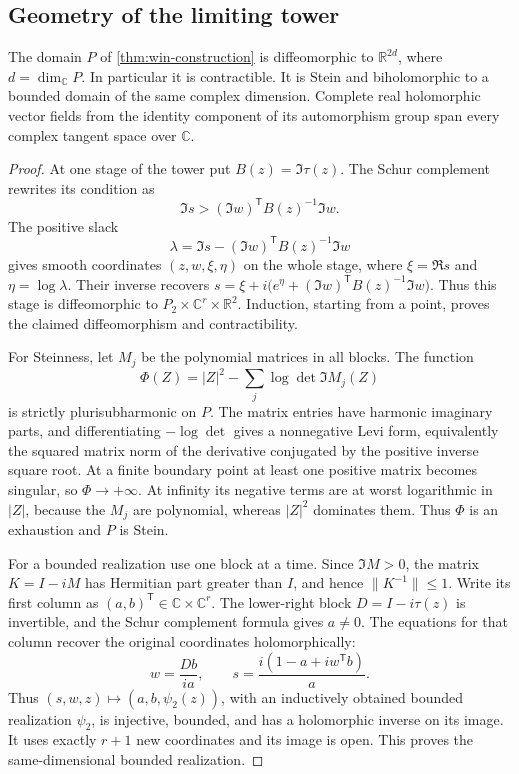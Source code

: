 \subsection{Geometry of the limiting tower}

\begin{proposition}\label{prop:win-tower-properties}
The domain $P$ of \cref{thm:win-construction} is diffeomorphic to $\mathbb{R}^{2d}$, where $d=\dim_{\mathbb{C}}P$.  In particular it is contractible.  It is Stein and biholomorphic to a bounded domain of the same complex dimension.  Complete real holomorphic vector fields from the identity component of its automorphism group span every complex tangent space over $\mathbb{C}$.
\end{proposition}

\begin{proof}
At one stage of the tower put $B(z)=\Im\tau(z)$.  The Schur complement rewrites its condition as
\[
       \Im s>(\Im w)^{\mathsf T}B(z)^{-1}\Im w.
\]
The positive slack
\[
 \lambda=\Im s-(\Im w)^{\mathsf T}B(z)^{-1}\Im w
\]
gives smooth coordinates $(z,w,\xi,\eta)$ on the whole stage, where $\xi=\Re s$ and $\eta=\log\lambda$.  Their inverse recovers $s=\xi+i\bigl(e^\eta+ (\Im w)^{\mathsf T}B(z)^{-1}\Im w\bigr)$. Thus this stage is diffeomorphic to $P_2\times\mathbb{C}^r\times\mathbb{R}^2$.  Induction, starting from a point, proves the claimed diffeomorphism and contractibility.

For Steinness, let $M_j$ be the polynomial matrices in all blocks. The function
\[
             \Phi(Z)=|Z|^2-\sum_j\log\det\Im M_j(Z)
\]
is strictly plurisubharmonic on $P$.  The matrix entries have harmonic imaginary parts, and differentiating $-\log\det$ gives a nonnegative Levi form, equivalently the squared matrix norm of the derivative conjugated by the positive inverse square root.  At a finite boundary point at least one positive matrix becomes singular, so $\Phi\to+\infty$.  At infinity its negative terms are at worst logarithmic in $|Z|$, because the $M_j$ are polynomial, whereas $|Z|^2$ dominates them.  Thus $\Phi$ is an exhaustion and $P$ is Stein.

For a bounded realization use one block at a time.  Since $\Im M>0$, the matrix $K=I-iM$ has Hermitian part greater than $I$, and hence $\|K^{-1}\|\le1$.  Write its first column as $(a,b)^{\mathsf T}\in\mathbb{C}\times\mathbb{C}^r$.  The lower-right block $D=I-i\tau(z)$ is invertible, and the Schur complement formula gives $a\ne0$.  The equations for that column recover the original coordinates holomorphically:
\[
       w=\frac{Db}{ia},\qquad
       s=\frac{i(1-a+iw^{\mathsf T}b)}{a}.
\]
Thus $(s,w,z)\mapsto(a,b,\psi_2(z))$, with an inductively obtained bounded realization $\psi_2$, is injective, bounded, and has a holomorphic inverse on its image.  It uses exactly $r+1$ new coordinates and its image is open.  This proves the same-dimensional bounded realization.


\end{proof}
